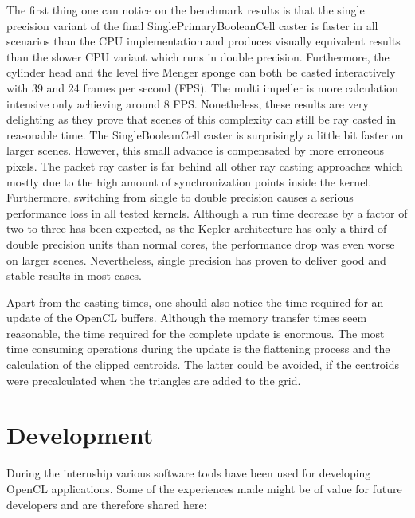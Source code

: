 The first thing one can notice on the benchmark results is that the single precision variant of the final SinglePrimaryBooleanCell caster is faster in all scenarios than the CPU implementation and produces visually equivalent results than the slower CPU variant which runs in double precision. Furthermore, the cylinder head and the level five Menger sponge can both be casted interactively with 39 and 24 frames per second (FPS). The multi impeller is more calculation intensive only achieving around 8 FPS. Nonetheless, these results are very delighting as they prove that scenes of this complexity can still be ray casted in reasonable time. The SingleBooleanCell caster is surprisingly a little bit faster on larger scenes. However, this small advance is compensated by more erroneous pixels. The packet ray caster is far behind all other ray casting approaches which mostly due to the high amount of synchronization points inside the kernel. Furthermore, switching from single to double precision causes a serious performance loss in all tested kernels. Although a run time decrease by a factor of two to three has been expected, as the Kepler architecture has only a third of double precision units than normal cores, the performance drop was even worse on larger scenes. Nevertheless, single precision has proven to deliver good and stable results in most cases.

Apart from the casting times, one should also notice the time required for an update of the OpenCL buffers. Although the memory transfer times seem reasonable, the time required for the complete update is enormous. The most time consuming operations during the update is the flattening process and the calculation of the clipped centroids. The latter could be avoided, if the centroids were precalculated when the triangles are added to the grid.

\section{Development}

During the internship various software tools have been used for developing OpenCL applications. Some of the experiences made might be of value for future developers and are therefore shared here:

